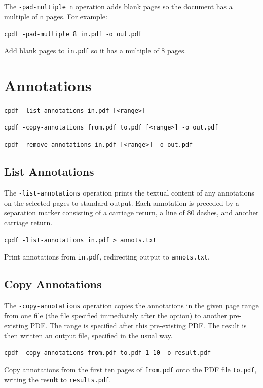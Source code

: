 \documentclass[a4paper,makeidx]{memoir}
\begin{document}
  The \verb!-pad-multiple n! operation adds blank pages so the document has a multiple of \verb!n! pages. For example:
  \begin{framed}
    \small\verb!cpdf -pad-multiple 8 in.pdf -o out.pdf!
 
    \vspace{2.5mm}
    \noindent Add blank pages to \texttt{in.pdf} so it has a multiple of 8 pages. 
  \end{framed}
 
\chapter{Annotations}
  \begin{framed}
  \small\noindent\verb!cpdf -list-annotations in.pdf [<range>]!

  \vspace{1.5mm}
  \small\noindent\verb!cpdf -copy-annotations from.pdf to.pdf [<range>] -o out.pdf!

  \vspace{1.5mm}
  \small\noindent\verb!cpdf -remove-annotations in.pdf [<range>] -o out.pdf!
  \end{framed}

  \section{List Annotations}
  The \texttt{-list-annotations} operation prints the textual content of any
annotations on the selected pages to standard output. Each annotation is
preceded by a separation marker consisting of a carriage return, a line of 80
dashes, and another carriage return.
  \begin{framed}
    \small\verb!cpdf -list-annotations in.pdf > annots.txt!
    
    \vspace{2.5mm}
    \noindent Print annotations from \texttt{in.pdf}, redirecting output to \texttt{annots.txt}.
  \end{framed}

  \section{Copy Annotations}
  The \texttt{-copy-annotations} operation copies the annotations in the given
page range from one file (the file specified immediately after the option) to
another pre-existing PDF. The range is specified after this pre-existing PDF.
The result is then written an output file, specified in the usual way.
  \begin{framed}
    \small\verb!cpdf -copy-annotations from.pdf to.pdf 1-10 -o result.pdf !
    
    \vspace{2.5mm}
    \noindent Copy annotations from the first ten pages of \texttt{from.pdf}
onto the PDF file \texttt{to.pdf}, writing the result to \texttt{results.pdf}.

  \end{framed}
\end{document}
